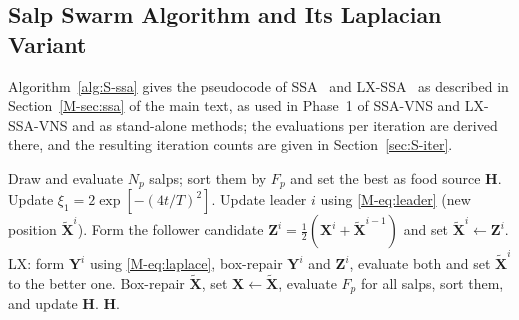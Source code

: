 \documentclass[10pt]{article}
\begin{document}
\subsection{Salp Swarm Algorithm and Its Laplacian Variant}
\label{sec:S-ssa-alg}
Algorithm~\ref{alg:S-ssa} gives the pseudocode of SSA~\cite{Mirjalili2017} and LX-SSA~\cite{Solanki2023} as described in Section~\ref{M-sec:ssa} of the main text, as used in Phase~1 of SSA-VNS and LX-SSA-VNS and as stand-alone methods; the evaluations per iteration are derived there, and the resulting iteration counts are given in Section~\ref{sec:S-iter}.

\begin{algorithm}[!htb]
\caption{SSA and LX-SSA (lines marked LX: LX-SSA only); evaluations per line in brackets}
\label{alg:S-ssa}
\begin{algorithmic}[1]
\State Draw and evaluate $N_p$ salps; sort them by $F_p$ and set the best as food source $\mathbf H$. \Comment{[$N_p$]}
    \State Update $\xi_1=2\exp[-(4t/T)^2]$.
            \State Update leader $i$ using \eqref{M-eq:leader} (new position $\tilde{\mathbf X}^i$).
        \Else
            \State Form the follower candidate $\mathbf Z^i=\tfrac{1}{2}(\mathbf X^i+\tilde{\mathbf X}^{i-1})$ and set $\tilde{\mathbf X}^i\gets\mathbf Z^i$.
            \State LX: form $\mathbf Y^i$ using \eqref{M-eq:laplace}, box-repair $\mathbf Y^i$ and $\mathbf Z^i$, evaluate both and set $\tilde{\mathbf X}^i$ to the better one. 
        \EndIf
    \EndFor
    \State Box-repair $\tilde{\mathbf X}$, set $\mathbf X\gets\tilde{\mathbf X}$, evaluate $F_p$ for all salps, sort them, and update $\mathbf H$. \Comment{[$N_p$]}
\EndFor
\State \Return $\mathbf H$.
\end{algorithmic}
\end{algorithm}
\end{document}
